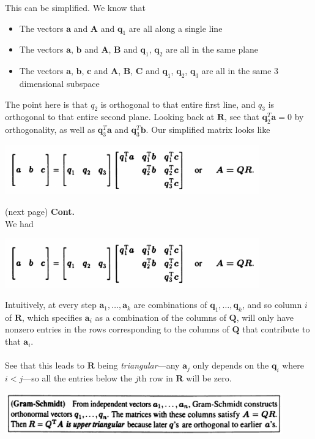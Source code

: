 \documentclass{report}
\begin{document}
This can be simplified. We know that
\begin{itemize}
\item The vectors $\bm a$ and $\bm A$ and $\bm q_1$ are all along a single line
\item The vectors $\bm a$, $\bm b$ and $\bm A$, $\bm B$ and $\bm q_1$, $\bm q_2$ are all in the same plane
\item The vectors $\bm a$, $\bm b$, $\bm c$ and $\bm A$, $\bm B$, $\bm C$ and $\bm q_1$, $\bm q_2$, $\bm q_3$ are all in the same 3 dimensional subspace
\end{itemize}
The point here is that $q_2$ is orthogonal to that entire first line, and $q_3$ is orthogonal to that entire second plane. Looking back at $\bm R$, see that 
$\bm q_2^T\bm a=0$ by orthogonality, as well as 
$\bm q_3^T\bm a$ and $\bm q_3^T\bm b$. Our simplified matrix looks like
\begin{center}
\includegraphics[width=11cm]{90}
\end{center}
(next page)\newpage
\noindent\textbf{Cont.}\\
We had
\begin{center}
\includegraphics[width=11cm]{90}
\end{center}
Intuitively, at every step $\bm a_1,\ldots,\bm a_k$ are combinations of $\bm q_1,\ldots,\bm q_k$, and so column $i$ of $\bm R$, which specifies $\bm a_i$ as a combination of 
the columns of $\bm Q$, will only have nonzero entries in the rows corresponding to the columns of $\bm Q$ that contribute to that $\bm a_i$.\\
\vspace{1mm}\\
See that this leads to $\bm R$ being \textit{triangular}---any $\bm a_j$ only depends on the $\bm q_i$ where $i<j$---so all the entries below the $j$th row in 
$\bm R$ will be zero. 
\begin{center}
\includegraphics[width=12cm]{91}
\end{center}
\end{document}
